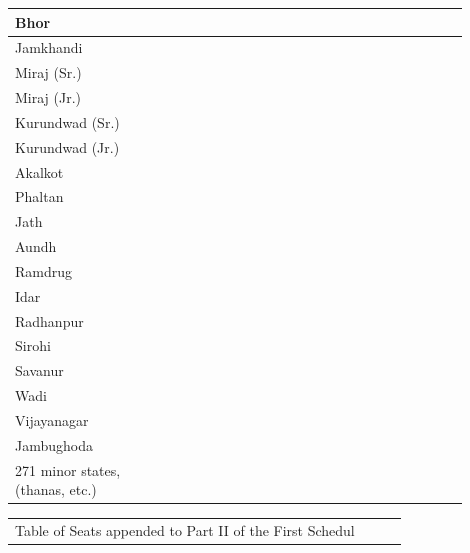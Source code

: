 \begin{longtable}{|p{0.30\linewidth}|p{0.30\linewidth}|p{0.30\linewidth}|}
 \\
\hline
Bhor

 \\
\hline
Jamkhandi

 \\
\hline
Miraj (Sr.)

 \\
\hline
Miraj (Jr.)

 \\
\hline
Kurundwad (Sr.)

 \\
\hline
Kurundwad (Jr.)

 \\
\hline
Akalkot

 \\
\hline
Phaltan

 \\
\hline
Jath

 \\
\hline
Aundh

 \\
\hline
Ramdrug

 \\
\hline
Idar

 \\
\hline
Radhanpur

 \\
\hline
Sirohi

 \\
\hline
Savanur

 \\
\hline
Wadi

 \\
\hline
Vijayanagar

 \\
\hline
Jambughoda

 \\
\hline
271 minor states, (thanas, etc.)

 \\
\hline
\end{longtable}
\medskip


\par\medskip
\begin{longtable}{|p{0.90\linewidth}|}
\hline
Table of Seats appended to Part II of the First Schedul\end{longtable}
\medskip
